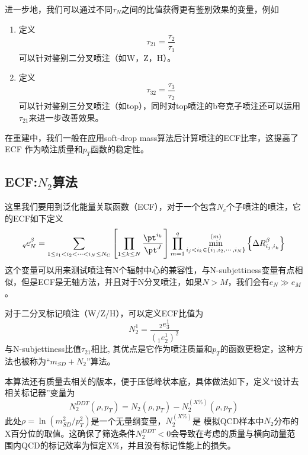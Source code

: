 进一步地，我们可以通过不同$\tau_N$之间的比值获得更有鉴别效果的变量，例如
\begin{enumerate}[(1)]
    \item 定义
    \begin{equation}
        \tau_{21}=\frac{\tau_2}{\tau_1}
    \end{equation}
    可以针对鉴别二分叉喷注（如W，Z，H）。
    \item 定义
    \begin{equation}
        \tau_{32}=\frac{\tau_3}{\tau_2}
    \end{equation}
    可以针对鉴别三分叉喷注（如top），同时对top喷注的b夸克子喷注还可以运用$\tau_{21}$来进一步改善效果。
\end{enumerate}
在重建中，我们一般在应用soft-drop mass算法后计算喷注的ECF比率，这提高了 ECF 作为喷注质量和$p_T$函数的稳定性。

\subsection{ECF:$N_2$算法}
这里我们要用到泛化能量关联函数（ECF），对于一个包含$N_c$个子喷注的喷注，它的ECF如下定义
\begin{equation}
    {}_{q}e_{N}^{\beta}=\sum_{1\leq i_{1}<i_{2}<\cdots<i_{N}\leq N_{\text{C}}}%
\left[\prod_{1\leq k\leq N}\frac{\pt^{i_{k}}}{\pt^{J}}\right]\prod_{m=1}^{q}%
\min_{i_{j}<i_{k}\in\{i_{1},i_{2},\cdots,i_{N}\}}^{(m)}\left\{\Delta R_{i_{j},%
i_{k}}^{\beta}\right\}
\end{equation}
这个变量可以用来测试喷注有N个辐射中心的兼容性，与N-subjettiness变量有点相似，但是ECF是无轴方法，并且对于N分叉喷注，如果$N>M$，我们会有$e_N\gg e_M$。

对于二分叉标记喷注（W/Z/H），可以定义ECF比值为
\begin{equation}
    N_{2}^{1}=\frac{{}_{2}e_{3}^{1}}{(_{1}e_{2}^{1})^{2}}
\end{equation}
与N-subjettiness比值$\tau_{21}$相比, 其优点是它作为喷注质量和$p_T$的函数更稳定，这种方法也被称为“$m_{SD}+N_2$”算法。

本算法还有质量去相关的版本，便于压低峰状本底，具体做法如下，定义“设计去相关标记器”变量为
\begin{equation}
    N_2^{DDT}(\rho,p_T)=N_2(\rho, p_T)-N_2^{(X\%)}(\rho,p_T)
\end{equation}
此处$\rho=\ln{(m_{SD}^2/p_T^2)}$是一个无量纲变量，$N_2^{(X\%)}$是
模拟QCD样本中$N_2$分布的X百分位的取值。这确保了筛选条件$N^{DDT}_2<0$会导致在考虑的质量与横向动量范围内QCD的标记效率为恒定X\%，并且没有标记性能上的损失。

